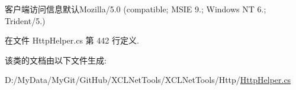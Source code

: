 客户端访问信息默认\-Mozilla/5.0 (compatible; M\-S\-I\-E 9.; Windows N\-T 6.; Trident/5.) 



在文件 Http\-Helper.\-cs 第 442 行定义.



该类的文档由以下文件生成\-:\begin{DoxyCompactItemize}
\item 
D\-:/\-My\-Data/\-My\-Git/\-Git\-Hub/\-X\-C\-L\-Net\-Tools/\-X\-C\-L\-Net\-Tools/\-Http/\hyperlink{_http_helper_8cs}{Http\-Helper.\-cs}\end{DoxyCompactItemize}
